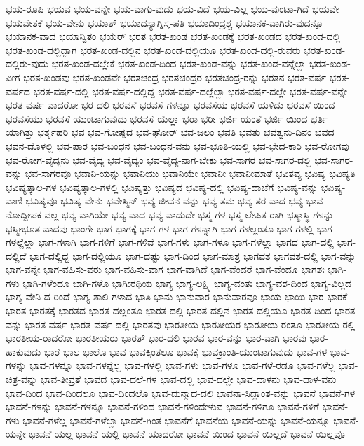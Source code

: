 {ಭಯ-ರೂಪಿ
ಭಯವ
ಭಯ-ವನ್ನೇ
ಭಯ-ವಾಗು-ವುದು
ಭಯ-ವಿದೆ
ಭಯ-ವಿಲ್ಲ
ಭಯ-ವುಂಟಾ-ಗಿದೆ
ಭಯವೇ
ಭಯವೇತಕೆ
ಭಯ-ವೇನು
ಭಯಾತ್
ಭಯಾದಸ್ಯಾಗ್ನಿಸ್ತ-ಪತಿ
ಭಯಾದಿಂದ್ರಶ್ಚ
ಭಯಾನಕ-ವಾಗಿರು-ವುದನ್ನೂ
ಭಯಾನಕ-ವಾದ
ಭಯಾನ್ವಿತಂ
ಭಯೆರ್
ಭರತ
ಭರತ-ಖಂಡ
ಭರತ-ಖಂಡಕ್ಕೆ
ಭರತ-ಖಂಡದ
ಭರತ-ಖಂಡ-ದಲ್ಲಿ
ಭರತ-ಖಂಡ-ದಲ್ಲಿದ್ದಾಗ
ಭರತ-ಖಂಡ-ದಲ್ಲಿನ
ಭರತ-ಖಂಡ-ದಲ್ಲಿಯೂ
ಭರತ-ಖಂಡ-ದಲ್ಲಿ-ರುವರು
ಭರತ-ಖಂಡ-ದಲ್ಲಿರು-ವುದು
ಭರತ-ಖಂಡ-ದಲ್ಲೇಕೆ
ಭರತ-ಖಂಡ-ದಿಂದ
ಭರತ-ಖಂಡ-ವನ್ನು
ಭರತ-ಖಂಡ-ವನ್ನೆಲ್ಲಾ
ಭರತ-ಖಂಡ-ವೀಗ
ಭರತ-ಖಂಡವು
ಭರತ-ಖಂಡವೇ
ಭರತಚಂದ್ರ
ಭರತಚಂದ್ರರ
ಭರತಚಂದ್ರ-ರನ್ನು
ಭರತನ
ಭರತ-ವರ್ಷ
ಭರತ-ವರ್ಷದ
ಭರತ-ವರ್ಷ-ದಲ್ಲಿ
ಭರತ-ವರ್ಷ-ದಲ್ಲಿದ್ದ
ಭರತ-ವರ್ಷ-ದಲ್ಲೆಲ್ಲಾ
ಭರತ-ವರ್ಷ-ದಲ್ಲೇ
ಭರತ-ವರ್ಷ-ವನ್ನೇ
ಭರತ-ವರ್ಷ-ವಾದರೋ
ಭರ-ದಲಿ
ಭರವಸೆ
ಭರವಸೆ-ಗಳನ್ನೂ
ಭರವಸೆಯ
ಭರವಸೆ-ಯಳಿದು
ಭರವಸೆ-ಯಿಂದ
ಭರವಸೆಯು
ಭರವಸೆ-ಯುಂಟಾಗುವುದು
ಭರವಸೆ-ಯೆಲ್ಲಾ
ಭರಾ
ಭರೀ
ಭರ್ಜಿ-ಯಂತೆ
ಭರ್ಜಿ-ಯಿಂದ
ಭರ್ತಿ-ಯಾಗಿತ್ತು
ಭರ್ತೃಹರಿ
ಭವ
ಭವ-ಗೋಷ್ಪದ
ಭವ-ಘೋರ್
ಭವ-ಜಲಂ
ಭವತಿ
ಭವತು
ಭವತ್ವನು-ದಿನಂ
ಭವದ
ಭವನ-ದೊಳಲ್ಲಿ
ಭವ-ಪಾರ
ಭವ-ಬಂಧನ
ಭವ-ಬಂಧನ-ವನು
ಭವ-ಭೂತಿ-ಯಲ್ಲಿ
ಭವ-ಭೇದ-ಕಾರಿ
ಭವ-ರೋಗವು
ಭವ-ರೋಗ-ವೈದ್ಯನು
ಭವ-ವೈದ್ಯ
ಭವ-ವೈದ್ಯಂ
ಭವ-ವೈದ್ಯ-ನಾಗ-ಬೇಕು
ಭವ-ಸಾಗರ
ಭವ-ಸಾಗರ-ದಲ್ಲಿ
ಭವ-ಸಾಗರ-ವನ್ನು
ಭವ-ಸಾಗರವೂ
ಭವಾನಿ-ಯನ್ನು
ಭವಾನಿಯು
ಭವಾನಿಯೇ
ಭವಾನೀ
ಭವಾನೀಮಾತೆ
ಭವಿತವ್ಯ
ಭವಿಷ್ಯ
ಭವಿಷ್ಯತಿ
ಭವಿಷ್ಯತ್ಕಾಲ-ಗಳ
ಭವಿಷ್ಯತ್ಕಾಲ-ಗಳಲ್ಲಿ
ಭವಿಷ್ಯತ್ತು
ಭವಿಷ್ಯದ
ಭವಿಷ್ಯ-ದಲ್ಲಿ
ಭವಿಷ್ಯ-ದಾಚೆಗೆ
ಭವಿಷ್ಯ-ವನ್ನು
ಭವಿಷ್ಯ-ವಾಣಿ
ಭವಿಷ್ಯವೂ
ಭವಿಷ್ಯ-ವೇನು
ಭವೇಸ್ಮಿನ್
ಭವ್ಯ-ಜೀವನ-ವನ್ನು
ಭವ್ಯ-ತಮ
ಭವ್ಯ-ತರ-ವಾದ
ಭವ್ಯ-ಭಾವ-ನೋದ್ದೀಪಕ-ವಲ್ಲ
ಭವ್ಯ-ವಾಗಿಯೇ
ಭವ್ಯ-ವಾದ
ಭವ್ಯ-ವಾದುದೇ
ಭಸ್ಮ-ಗಳ
ಭಸ್ಮ-ಲೇಪಿತ-ರಾಗಿ
ಭಸ್ಮಾಸ್ಥಿ-ಗಳನ್ನು
ಭಸ್ಮೀಭೂತ-ವಾದವು
ಭಾಂಗೇ
ಭಾಗ
ಭಾಗಕ್ಕೆ
ಭಾಗ-ಗಳ
ಭಾಗ-ಗಳನ್ನಾಗಿ
ಭಾಗ-ಗಳಲ್ಲಂತೂ
ಭಾಗ-ಗಳಲ್ಲಿ
ಭಾಗ-ಗಳಲ್ಲೆಲ್ಲಾ
ಭಾಗ-ಗಳಾಗಿ
ಭಾಗ-ಗಳಿಗೆ
ಭಾಗ-ಗಳಿವೆ
ಭಾಗ-ಗಳು
ಭಾಗ-ಗಳೂ
ಭಾಗ-ಗಳೆಲ್ಲಾ
ಭಾಗದ
ಭಾಗ-ದಲ್ಲಿ
ಭಾಗ-ದಲ್ಲಿದೆ
ಭಾಗ-ದಲ್ಲಿದ್ದ
ಭಾಗ-ದಲ್ಲಿಯೂ
ಭಾಗ-ದಷ್ಟು
ಭಾಗ-ದಿಂದ
ಭಾಗ-ಮಾತ್ರ
ಭಾಗವತ
ಭಾಗವತ-ದಲ್ಲಿ
ಭಾಗ-ವನ್ನು
ಭಾಗ-ವನ್ನೇ
ಭಾಗ-ವಹಿಸು-ವರು
ಭಾಗ-ವಹಿಸು-ವಾಗ
ಭಾಗ-ವಾಗಿದೆ
ಭಾಗ-ವೆಂದರೆ
ಭಾಗ-ವೆಂದೂ
ಭಾಗಶಃ
ಭಾಗಿ-ಗಳು
ಭಾಗಿ-ಗಳೆಂದೂ
ಭಾಗಿ-ಗಳೊ
ಭಾಗೀರಥಿಯ
ಭಾಗ್ಯ
ಭಾಗ್ಯ-ಲಕ್ಷ್ಮಿ
ಭಾಗ್ಯ-ವಂತಃ
ಭಾಗ್ಯ-ವಶ-ದಿಂದ
ಭಾಗ್ಯ-ವಿಲ್ಲದ
ಭಾಗ್ಯ-ವೇನಿ-ದ-ರಿಂದೆ
ಭಾಗ್ಯ-ಶಾಲಿ-ಗಳಾದ
ಭಾತಿ
ಭಾನು
ಭಾನುವಾರ
ಭಾನುವಾರವೂ
ಭಾಯ
ಭಾಯಿ
ಭಾರ
ಭಾರಕೆ
ಭಾರತ
ಭಾರತಕ್ಕೆ
ಭಾರತದ
ಭಾರತ-ದಲ್ಲಂತೂ
ಭಾರತ-ದಲ್ಲಿ
ಭಾರತ-ದಲ್ಲಿನ
ಭಾರತ-ದಲ್ಲಿಯೂ
ಭಾರತ-ದಿಂದ
ಭಾರತ-ವನ್ನು
ಭಾರತ-ವರ್ಷ
ಭಾರತ-ವರ್ಷ-ದಲ್ಲಿ
ಭಾರತವು
ಭಾರತೀಯ
ಭಾರತೀಯರ
ಭಾರತೀಯ-ರಂತೂ
ಭಾರತೀಯ-ರಲ್ಲಿ
ಭಾರತೀಯ-ರಾದರೋ
ಭಾರತೀಯರು
ಭಾರತ್
ಭಾರ-ದಲಿ
ಭಾರವ
ಭಾರ-ವನ್ನು
ಭಾರ-ವಾಗಿ
ಭಾರವು
ಭಾರ-ಹಾಕುವುದು
ಭಾರೆ
ಭಾಲ
ಭಾಲೊ
ಭಾವ
ಭಾವಕ್ಕಿಂತಲೂ
ಭಾವಕ್ಕೆ
ಭಾವಕ್ರಾಂತಿ-ಯುಂಟಾಗುವುದು
ಭಾವ-ಗಳ
ಭಾವ-ಗಳನ್ನು
ಭಾವ-ಗಳನ್ನೂ
ಭಾವ-ಗಳನ್ನೆಲ್ಲ
ಭಾವ-ಗಳಲ್ಲಿ
ಭಾವ-ಗಳು
ಭಾವ-ಗಳೂ
ಭಾವ-ಗಳೆ-ರಡೂ
ಭಾವ-ಗಳೆಲ್ಲ
ಭಾವ-ಚಿತ್ರ-ವನ್ನು
ಭಾವ-ತೀವ್ರತೆ
ಭಾವದ
ಭಾವ-ದಲೆ-ಗಳ
ಭಾವ-ದಲ್ಲಿ
ಭಾವ-ದಲ್ಲೇ
ಭಾವ-ದಾಳನು
ಭಾವ-ದಾಳ-ವನು
ಭಾವ-ದಿಂದ
ಭಾವ-ದಿಂದಲೂ
ಭಾವ-ದಿಂದಲೊ
ಭಾವ-ದುನ್ಮಾದ-ದಲಿ
ಭಾವನಾ-ಸಿದ್ಧಾಂತ-ವನ್ನು
ಭಾವನೆ
ಭಾವನೆ-ಗಳ
ಭಾವನೆ-ಗಳನ್ನು
ಭಾವನೆ-ಗಳನ್ನೂ
ಭಾವನೆ-ಗಳಿಂದ
ಭಾವನೆ-ಗಳಿಂದೇಳುವ
ಭಾವನೆ-ಗಳಿಗೂ
ಭಾವನೆ-ಗಳಿಗೆ
ಭಾವನೆ-ಗಳು
ಭಾವನೆ-ಗಳೆಲ್ಲ
ಭಾವನೆ-ಗಳೆಲ್ಲಾ
ಭಾವನೆ-ಗಿಂತ
ಭಾವನೆಗೆ
ಭಾವನೆಯ
ಭಾವನೆ-ಯನ್ನು
ಭಾವನೆ-ಯನ್ನೂ
ಭಾವನೆ-ಯನ್ನೇ
ಭಾವನೆ-ಯಲ್ಲ
ಭಾವನೆ-ಯಲ್ಲಿ
ಭಾವನೆ-ಯಾದರೋ
ಭಾವನೆ-ಯಿಂದ
ಭಾವನೆ-ಯಿಲ್ಲದೆ
ಭಾವನೆ-ಯಿಲ್ಲವೊ
}
